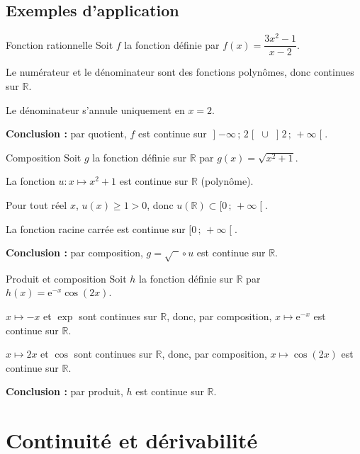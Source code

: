 \documentclass[11pt,a4paper]{article}
\newcommand{\R}{\mathbb{R}}
\newcommand{\e}{\mathrm{e}}
\newcommand{\intoo}[2]{\mathopen{]}#1\,;\,#2\mathclose{[}}
\newcommand{\intfo}[2]{\mathopen{[}#1\,;\,#2\mathclose{[}}
\begin{document}
\subsection{Exemples d'application}

\begin{exemple}{Fonction rationnelle}{}
Soit $f$ la fonction définie par $f(x)=\dfrac{3x^2-1}{x-2}$.
\begin{etapes}
  \item Le numérateur et le dénominateur sont des fonctions polynômes,
        donc continues sur $\R$.
  \item Le dénominateur s'annule uniquement en $x=2$.
\end{etapes}
\textbf{Conclusion :} par quotient, $f$ est continue sur
$\intoo{-\infty}{2}\;\cup\;\intoo{2}{+\infty}$.
\end{exemple}

\begin{exemple}{Composition}{}
Soit $g$ la fonction définie sur $\R$ par $g(x)=\sqrt{x^2+1}$.
\begin{etapes}
  \item La fonction $u:x\longmapsto x^2+1$ est continue sur $\R$ (polynôme).
  \item Pour tout réel $x$, $u(x)\geqslant 1>0$, donc $u(\R)\subset\intfo{0}{+\infty}$.
  \item La fonction racine carrée est continue sur $\intfo{0}{+\infty}$.
\end{etapes}
\textbf{Conclusion :} par composition, $g=\sqrt{\phantom{x}}\circ u$ est continue
sur $\R$.
\end{exemple}

\begin{exemple}{Produit et composition}{}
Soit $h$ la fonction définie sur $\R$ par $h(x)=\e^{-x}\cos(2x)$.
\begin{etapes}
  \item $x\mapsto -x$ et $\exp$ sont continues sur $\R$, donc, par composition,
        $x\mapsto \e^{-x}$ est continue sur $\R$.
  \item $x\mapsto 2x$ et $\cos$ sont continues sur $\R$, donc, par composition,
        $x\mapsto\cos(2x)$ est continue sur $\R$.
\end{etapes}
\textbf{Conclusion :} par produit, $h$ est continue sur $\R$.
\end{exemple}

\section{Continuité et dérivabilité}
\end{document}
